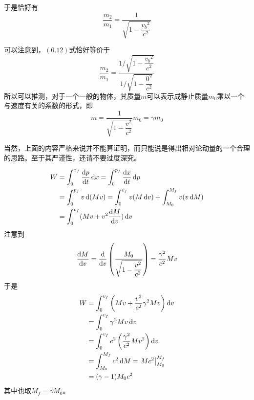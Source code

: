 \begin{prove}[$p=\gamma mv$]
	于是恰好有
	\begin{equation}
		\dfrac{m_2}{m_1}=\dfrac{1}{\sqrt{1-\dfrac{v_b{}^2}{c^2}}}
	\end{equation}
	
	可以注意到，$(6.12)$式恰好等价于
	\begin{equation}
		\dfrac{m_2}{m_1}=\dfrac{1/\sqrt{1-\dfrac{v_b{}^2}{c^2}}}{1/\sqrt{1-\dfrac{0^2}{c^2}}}
	\end{equation}
	所以可以推测，对于一个一般的物体，其质量$m$可以表示成静止质量$m_0$乘以一个与速度有关的系数的形式，即
	\begin{equation}
		m=\dfrac{1}{\sqrt{1-\dfrac{v^2}{c^2}}}m_0=\gamma m_0
	\end{equation}
	
	当然，上面的内容严格来说并不能算证明，而只能说是得出相对论动量的一个合理的思路。至于其严谨性，还请不要过度深究。
\end{prove}
\begin{prove}[$K=W=(\gamma -1)M_0c^2$]
	\[\begin{aligned}
		W&=\int_0^{x_f} \dfrac{\dif p}{\dif t}\dif x=\int_0^{p_f}\dfrac{\dif x}{\dif t}\dif p\\
		&=\int_0^{p_f}v\dif(Mv)=\int_0^{v_f}v(M\dif v)+\int_{M_0}^{M_f}v(v\dif M)\\
		&=\int_0^{v_f}(Mv+v^2\dfrac{\dif M}{\dif v})\dif v
	\end{aligned}\]
	注意到
	\[\dfrac{\dif M}{\dif v}=\dfrac{\dif}{\dif v}\left(\dfrac{M_0}{\sqrt{1-\dfrac{v^2}{c^2}}}\right)=\dfrac{\gamma^2}{c^2} Mv\]
	于是
	\[\begin{aligned}
		W&=\int_0^{v_f}\left(Mv+\dfrac{v^2}{c^2}\gamma^2 Mv\right)\dif v\\
		&=\int_0^{v_f}\gamma^2Mv\dif v\\
		&=\int_0^{v_f}c^2\left(\dfrac{\gamma^2}{c^2}Mv^2\right)\dif v\\
		&=\int_{M_0}^{M_f}c^2\dif M=\left.Mc^2\right|_{M_0}^{M_f}\\
		&=(\gamma-1)M_0c^2
	\end{aligned}\]
	其中也取$M_f=\gamma M_0$。
\end{prove}
